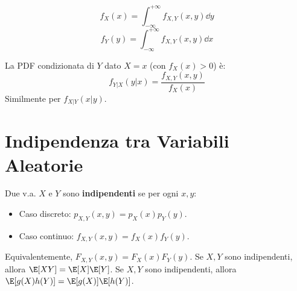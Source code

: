 \begin{definition}
\[ f_X(x) = \int_{-\infty}^{+\infty} f_{X,Y}(x,y) \dd y \]
\[ f_Y(y) = \int_{-\infty}^{+\infty} f_{X,Y}(x,y) \dd x \]
\end{definition}

\begin{definition}
La PDF condizionata di $Y$ dato $X=x$ (con $f_X(x)>0$) è:
\[ f_{Y|X}(y|x) = \frac{f_{X,Y}(x,y)}{f_X(x)} \]
Similmente per $f_{X|Y}(x|y)$.
\end{definition}

\section{Indipendenza tra Variabili Aleatorie}
\begin{definition}[Indipendenza]
Due v.a. $X$ e $Y$ sono \textbf{indipendenti} se per ogni $x,y$:
\begin{itemize}
    \item Caso discreto: $p_{X,Y}(x,y) = p_X(x) p_Y(y)$.
    \item Caso continuo: $f_{X,Y}(x,y) = f_X(x) f_Y(y)$.
\end{itemize}
Equivalentemente, $F_{X,Y}(x,y) = F_X(x) F_Y(y)$.
Se $X,Y$ sono indipendenti, allora $\E[XY] = \E[X]\E[Y]$.
Se $X,Y$ sono indipendenti, allora $\E[g(X)h(Y)] = \E[g(X)]\E[h(Y)]$.
\end{definition}

